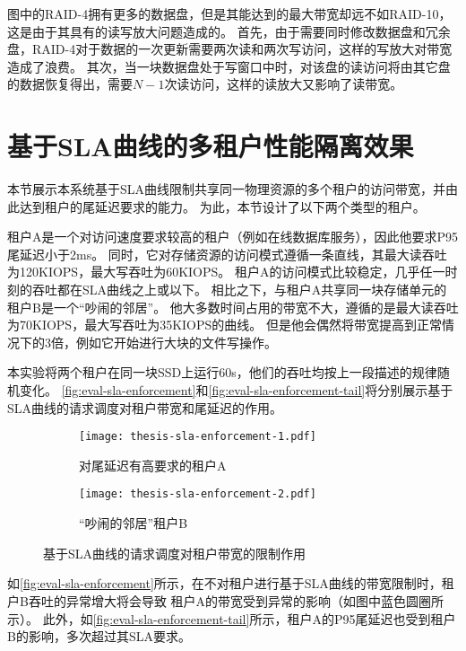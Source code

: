 图中的RAID-4拥有更多的数据盘，但是其能达到的最大带宽却远不如RAID-10，这是由于其具有的读写放大问题造成的。
首先，由于需要同时修改数据盘和冗余盘，RAID-4对于数据的一次更新需要两次读和两次写访问，这样的写放大对带宽造成了浪费。
其次，当一块数据盘处于写窗口中时，对该盘的读访问将由其它盘的数据恢复得出，需要$N - 1$次读访问，这样的读放大又影响了读带宽。

\section{基于SLA曲线的多租户性能隔离效果}
\label{sec:eval-sla-enforcement}

本节展示本系统基于SLA曲线限制共享同一物理资源的多个租户的访问带宽，并由此达到租户的尾延迟要求的能力。
为此，本节设计了以下两个类型的租户。

租户A是一个对访问速度要求较高的租户（例如在线数据库服务），因此他要求P95尾延迟小于2ms。
同时，它对存储资源的访问模式遵循一条直线，其最大读吞吐为120KIOPS，最大写吞吐为60KIOPS。
租户A的访问模式比较稳定，几乎任一时刻的吞吐都在SLA曲线之上或以下。
相比之下，与租户A共享同一块存储单元的租户B是一个“吵闹的邻居”。
他大多数时间占用的带宽不大，遵循的是最大读吞吐为70KIOPS，最大写吞吐为35KIOPS的曲线。
但是他会偶然将带宽提高到正常情况下的3倍，例如它开始进行大块的文件写操作。

本实验将两个租户在同一块SSD上运行60s，他们的吞吐均按上一段描述的规律随机变化。
\autoref{fig:eval-sla-enforcement}和\autoref{fig:eval-sla-enforcement-tail}将分别展示基于SLA曲线的请求调度对租户带宽和尾延迟的作用。

\begin{figure}[h]
  \centering
  \begin{subfigure}[b]{0.48\textwidth}
    \centering
    \texttt{[image: thesis-sla-enforcement-1.pdf]}
    \caption{对尾延迟有高要求的租户A}
    \label{fig:eval-sla-enforcement-a}
  \end{subfigure}
  \begin{subfigure}[b]{0.48\textwidth}
    \centering
    \texttt{[image: thesis-sla-enforcement-2.pdf]}
    \caption{“吵闹的邻居”租户B}
    \label{fig:eval-sla-enforcement-b}
  \end{subfigure}
  \caption{基于SLA曲线的请求调度对租户带宽的限制作用}
  \label{fig:eval-sla-enforcement}
\end{figure}

如\autoref{fig:eval-sla-enforcement}所示，在不对租户进行基于SLA曲线的带宽限制时，租户B吞吐的异常增大将会导致
租户A的带宽受到异常的影响（如图中蓝色圆圈所示）。
此外，如\autoref{fig:eval-sla-enforcement-tail}所示，租户A的P95尾延迟也受到租户B的影响，多次超过其SLA要求。

